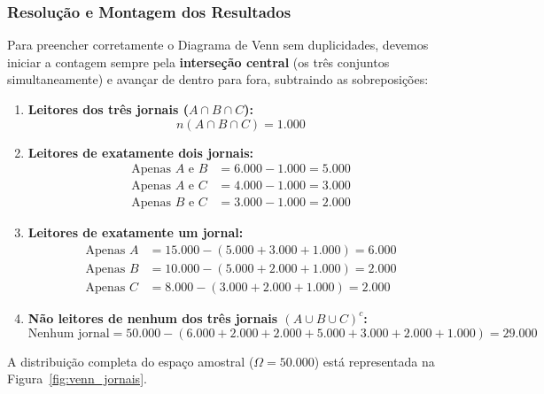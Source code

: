 \subsubsection*{Resolução e Montagem dos Resultados}

Para preencher corretamente o Diagrama de Venn sem duplicidades, devemos iniciar a contagem sempre pela \textbf{interseção central} (os três conjuntos simultaneamente) e avançar de dentro para fora, subtraindo as sobreposições:

\begin{enumerate}
    \item \textbf{Leitores dos três jornais ($A \cap B \cap C$):}
    \[
    n(A \cap B \cap C) = 1.000
    \]

    \item \textbf{Leitores de exatamente dois jornais:}
    \begin{align*}
    \text{Apenas } A \text{ e } B &= 6.000 - 1.000 = 5.000 \\
    \text{Apenas } A \text{ e } C &= 4.000 - 1.000 = 3.000 \\
    \text{Apenas } B \text{ e } C &= 3.000 - 1.000 = 2.000
    \end{align*}

    \item \textbf{Leitores de exatamente um jornal:}
    \begin{align*}
    \text{Apenas } A &= 15.000 - (5.000 + 3.000 + 1.000) = 6.000 \\
    \text{Apenas } B &= 10.000 - (5.000 + 2.000 + 1.000) = 2.000 \\
    \text{Apenas } C &= 8.000 - (3.000 + 2.000 + 1.000) = 2.000
    \end{align*}

    \item \textbf{Não leitores de nenhum dos três jornais $(A \cup B \cup C)^c$:}
    \[
    \text{Nenhum jornal} = 50.000 - (6.000 + 2.000 + 2.000 + 5.000 + 3.000 + 2.000 + 1.000) = 29.000
    \]
\end{enumerate}

A distribuição completa do espaço amostral ($\Omega = 50.000$) está representada na Figura~\ref{fig:venn_jornais}.

